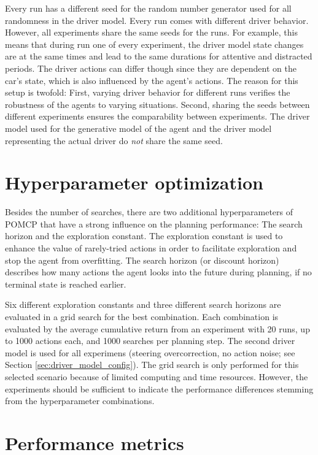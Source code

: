 Every run has a different seed for the random number generator used for all randomness in the driver model. Every run comes with different driver behavior. However, all experiments share the same seeds for the runs. For example, this means that during run one of every experiment, the driver model state changes are at the same times and lead to the same durations for attentive and distracted periods. The driver actions can differ though since they are dependent on the car's state, which is also influenced by the agent's actions. The reason for this setup is twofold: First, varying driver behavior for different runs verifies the robustness of the agents to varying situations. Second, sharing the seeds between different experiments ensures the comparability between experiments. The driver model used for the generative model of the agent and the driver model representing the actual driver do \emph{not} share the same seed.

\section{Hyperparameter optimization}
\label{sec:exp_hyperparams}

Besides the number of searches, there are two additional hyperparameters of POMCP that have a strong influence on the planning performance: The search horizon and the exploration constant. The exploration constant is used to enhance the value of rarely-tried actions in order to facilitate exploration and stop the agent from overfitting. The search horizon (or discount horizon) describes how many actions the agent looks into the future during planning, if no terminal state is reached earlier.

Six different exploration constants and three different search horizons are evaluated in a grid search for the best combination. Each combination is evaluated by the average cumulative return from an experiment with 20 runs, up to 1000 actions each, and 1000 searches per planning step. The second driver model is used for all experimens (steering overcorrection, no action noise; see Section \ref{sec:driver_model_config}). The grid search is only performed for this selected scenario because of limited computing and time resources. However, the experiments should be sufficient to indicate the performance differences stemming from the hyperparameter combinations.

\section{Performance metrics}
\label{sec:perf_metrics}

